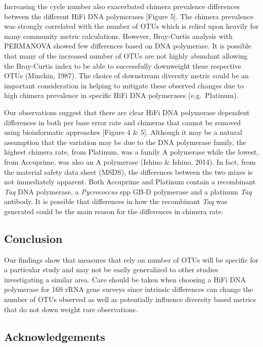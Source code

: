\documentclass[12pt,]{article}
\begin{document}
Increasing the cycle number also exacerbated chimera prevalence
differences between the different HiFi DNA polymerases {[}Figure 5{]}.
The chimera prevalence was strongly correlated with the number of OTUs
which is relied upon heavily for many community metric calculations.
However, Bray-Curtis analysis with PERMANOVA showed few differences
based on DNA polymerase. It is possible that many of the increased
number of OTUs are not highly abundant allowing the Bray-Curtis index to
be able to successfully downweight these respective OTUs (Minchin,
1987). The choice of downstream diversity metric could be an important
consideration in helping to mitigate these observed changes due to high
chimera prevalence in specific HiFi DNA polymerases (e.g.~Platinum).

Our observations suggest that there are clear HiFi DNA polymerase
dependent differences in both per base error rate and chimeras that
cannot be removed using bioinformatic approaches {[}Figure 4 \& 5{]}.
Although it may be a natural assumption that the variation may be due to
the DNA polymerase family, the highest chimera rate, from Platinum, was
a family A polymerase while the lowest, from Accuprime, was also an A
polymerase (Ishino \& Ishino, 2014). In fact, from the material safety
data sheet (MSDS), the differences between the two mixes is not
immediately apparent. Both Accuprime and Platinum contain a recombinant
\emph{Taq} DNA polymerase, a \emph{Pycrococcus} spp GB-D polymerase and
a platinum \emph{Taq} antibody. It is possible that differences in how
the recombinant \emph{Taq} was generated could be the main reason for
the differences in chimera rate.

\newpage

\subsection{Conclusion}\label{conclusion}

Our findings show that measures that rely on number of OTUs will be
specific for a particular study and may not be easily generalized to
other studies investigating a similar area. Care should be taken when
choosing a HiFi DNA polymerase for 16S rRNA gene surveys since intrinsic
differences can change the number of OTUs observed as well as
potentially influence diversity based metrics that do not down weight
rare observations.

\newpage

\subsection{Acknowledgements}\label{acknowledgements}
\end{document}
